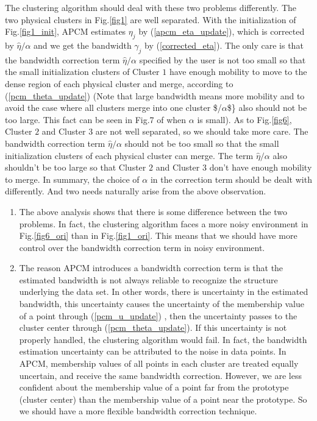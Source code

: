 \documentclass[journal]{IEEEtran}
\begin{document}
The clustering algorithm should deal with these two problems differently. The two physical clusters in Fig.\ref{fig1} are well separated. With the initialization of Fig.\ref{fig1_init}, APCM estimates $\eta_j$ by (\ref{apcm_eta_update}), which is corrected by $\hat{\eta}/\alpha$ and we get the bandwidth $\gamma_j$ by (\ref{corrected_eta}). The only care is that the bandwidth correction term $\hat{\eta}/\alpha$ specified by the user is not too small so that the small initialization clusters of Cluster $1$ have enough mobility to move to the dense region of each physical cluster and  merge, according to (\ref{pcm_theta_update}) (Note that large bandwidth means more mobility and to avoid the case where all clusters merge into one cluster \$\hat{\eta}/$\alpha$\$\} also should not be too large. This fact can be seen in Fig.7 of \cite{xenaki_novel_2016} when $\alpha$ is small).
As to Fig.\ref{fig6}, Cluster $2$ and Cluster $3$ are not well separated, so we should take more care. The bandwidth correction term $\hat{\eta}/\alpha$ should not be too small so that the small initialization clusters of each physical cluster can merge. The term $\hat{\eta}/\alpha$ also shouldn't be too large so that Cluster $2$ and Cluster $3$ don't have enough mobility to merge.
In summary, the choice of $\alpha$ in the correction term should be dealt with differently. And two needs naturally arise from the above observation.
\begin{enumerate}
\item The above analysis shows that there is some difference between the two problems. In fact, the clustering algorithm faces a more noisy environment in Fig.\ref{fig6_ori} than in Fig.\ref{fig1_ori}. This means that we should have more control over the bandwidth correction term in noisy environment.
\item The reason APCM introduces a bandwidth correction term is that the estimated bandwidth is not always reliable to recognize the structure underlying the data set. In other words, there is uncertainty in the estimated bandwidth, this uncertainty causes the uncertainty of the membership value of a point through (\ref{pcm_u_update}) , then the uncertainty passes to the cluster center through (\ref{pcm_theta_update}). If this uncertainty is not properly handled, the clustering algorithm would fail. 
In fact, the bandwidth estimation uncertainty can be attributed to the noise in data points.
In APCM, membership values of all points in each cluster are treated equally uncertain, and receive the same bandwidth correction.
However, we are less confident about the membership value of a point far from the prototype (cluster center) than the membership value of a point near the prototype. So we should have a more flexible bandwidth correction technique.
\end{enumerate}
\end{document}
